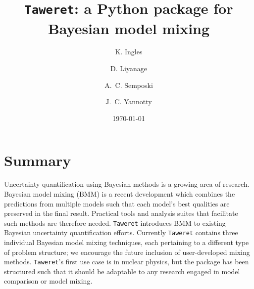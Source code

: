 \documentclass[10pt, preprint,aps,prc,floatfix,
tightenlines,
nofootinbib,superscriptaddress]{revtex4-2}
\begin{document}

\title{\texttt{Taweret}: a Python package for Bayesian model mixing}%

\author{K. Ingles}

\author{D. Liyanage}

\author{A.~C. Semposki}

\author{J.~C. Yannotty}

\date{\today}%

\maketitle

\section{Summary}
Uncertainty quantification using Bayesian methods is a growing area of research.
Bayesian model mixing (BMM) is a recent development which combines the predictions from multiple models such that each model's best qualities are preserved in the final result. 
Practical tools and analysis suites that facilitate such methods are therefore needed.
\texttt{Taweret} introduces BMM to existing Bayesian uncertainty quantification efforts. Currently \texttt{Taweret} contains three individual Bayesian model mixing techniques, each pertaining to a different type of problem structure; we encourage the future inclusion of user-developed mixing methods.
\texttt{Taweret}'s first use case is in nuclear physics, but the package has been structured such that it should be adaptable to any research engaged in model comparison or model mixing.
\end{document}
